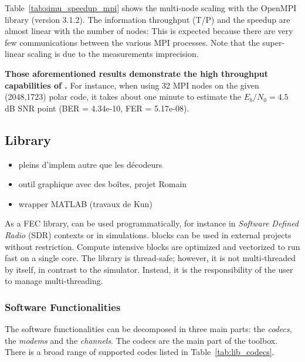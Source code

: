 Table~\ref{tab:simu_speedup_mpi} shows the multi-node scaling with the OpenMPI
library (version 3.1.2). The information throughput (T/P) and the speedup are
almost linear with the number of nodes: This is expected because there are very
few communications between the various MPI processes. Note that the super-linear
scaling is due to the measurements imprecision.

\textbf{Those aforementioned results demonstrate the high throughput
capabilities of \AFFECT.} For instance, when using 32 MPI nodes on the given
(2048,1723) polar code, it takes about one minute to estimate the $E_b/N_0=4.5$
dB SNR point (BER = 4.34e-10, FER = 5.17e-08).

\subsection{Library~\cite{Cassagne2019a}}

\begin{itemize}
  \item pleins d'implem autre que les décodeurs
  \item outil graphique avec des boîtes, projet Romain
  \item wrapper MATLAB (travaux de Kun)
\end{itemize}

As a FEC library, \AFFECT can be used programmatically, for instance in
\emph{Software Defined Radio} (SDR) contexts or in simulations. \AFFECT blocks
can be used in external projects without restriction. Compute intensive blocks
are optimized and vectorized to run fast on a single core. The library is
thread-safe; however, it is not multi-threaded by itself, in contrast to the
simulator. Instead, it is the responsibility of the user to manage
multi-threading.

\subsubsection{Software Functionalities}

The \AFFECT software functionalities can be decomposed in three main parts: the
\textit{codecs}, the \textit{modems} and the \textit{channels}. The codecs are
the main part of the toolbox. There is a broad range of supported codes listed
in Table~\ref{tab:lib_codecs}.

